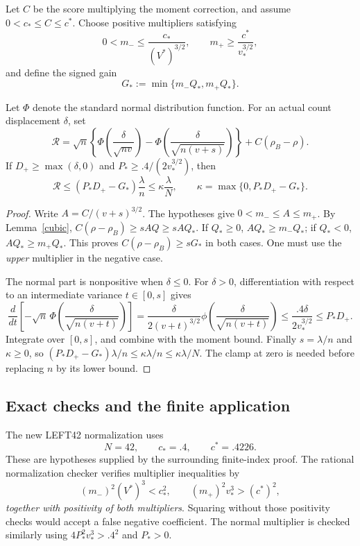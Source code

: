 Let $C$ be the score multiplying the moment correction, and assume
$0<c_*\le C\le c^*$. Choose positive multipliers satisfying
\[
        0<m_-\le\frac{c_*}{(V^*)^{3/2}},\qquad
        m_+\ge\frac{c^*}{v_*^{3/2}},
\]
and define the signed gain
\begin{equation}\label{gain}
             G_*:=\min\{m_-Q_*,m_+Q_*\}.
\end{equation}

\begin{proposition}\label{repair}
Let $\Phi$ denote the standard normal distribution function. For an actual
count displacement $\delta$, set
\[
 \mathcal R=\sqrt n\left\{
 \Phi\!\left(\frac{\delta}{\sqrt{nv}}\right)
 -\Phi\!\left(\frac{\delta}{\sqrt{n(v+s)}}\right)\right\}
                         +C(\rho_B-\rho).
\]
If $D_+\ge\max(\delta,0)$ and $P_*\ge .4/(2v_*^{3/2})$, then
\begin{equation}\label{repair_bound}
 \mathcal R\le(P_*D_+-G_*)\frac{\lambda}{n}
 \le \kappa\frac{\lambda}{N},\qquad
 \kappa=\max\{0,P_*D_+-G_*\}.
\end{equation}
\end{proposition}
\begin{proof}
Write $A=C/(v+s)^{3/2}$. The hypotheses give
$0<m_-\le A\le m_+$. By Lemma~\ref{cubic},
$C(\rho-\rho_B)\ge sAQ\ge sAQ_*$.
If $Q_*\ge0$, $AQ_*\ge m_-Q_*$; if $Q_*<0$,
$AQ_*\ge m_+Q_*$. This proves $C(\rho-\rho_B)\ge sG_*$
in both cases. One must use the \emph{upper} multiplier in the negative
case.

The normal part is nonpositive when $\delta\le0$.
For $\delta>0$, differentiation with respect to an intermediate variance
$t\in[0,s]$ gives
\[
 \frac{d}{dt}\left[-\sqrt n\,
 \Phi\!\left(\frac{\delta}{\sqrt{n(v+t)}}\right)\right]
 =\frac{\delta}{2(v+t)^{3/2}}
   \phi\!\left(\frac{\delta}{\sqrt{n(v+t)}}\right)
 \le\frac{.4\delta}{2v_*^{3/2}}\le P_*D_+.
\]
Integrate over $[0,s]$, and combine with the moment bound.
Finally $s=\lambda/n$ and $\kappa\ge0$, so
$(P_*D_+-G_*)\lambda/n\le\kappa\lambda/n\le\kappa\lambda/N$.
The clamp at zero is needed before replacing $n$ by its lower bound.
\end{proof}

\subsection{Exact checks and the finite application}
The new LEFT42 normalization uses
\[
                    N=42,\qquad c_*=.4,\qquad c^*=.4226.
\]
These are hypotheses supplied by the surrounding finite-index proof.
The rational normalization checker verifies multiplier inequalities by
\[
 (m_-)^2(V^*)^3<c_*^2,\qquad
 (m_+)^2v_*^3>(c^*)^2,
\]
\emph{together with positivity of both multipliers}. Squaring without
those positivity checks would accept a false negative coefficient.
The normal multiplier is checked similarly using
$4P_*^2v_*^3>.4^2$ and $P_*>0$.


